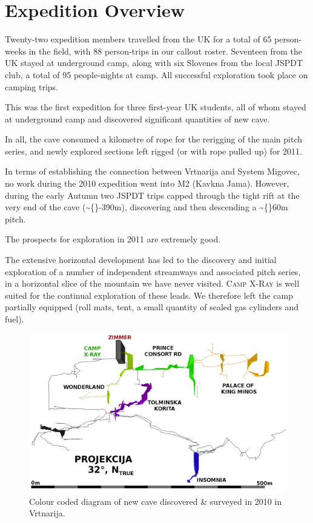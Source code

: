 \section{Expedition Overview}\label{expedition-overview}

Twenty-two expedition members travelled from the UK for a total of 65
person-weeks in the field, with 88 person-trips in our callout roster.
Seventeen from the UK stayed at underground camp, along with six
Slovenes from the local JSPDT club, a total of 95 people-nights at camp.
All successful exploration took place on camping trips.

This was the first expedition for three first-year UK students, all of
whom stayed at underground camp and discovered significant quantities of
new cave.

In all, the cave consumed a kilometre of rope for the rerigging of the
main pitch series, and newly explored sections left rigged (or with rope
pulled up) for 2011.

In terms of establishing the connection between Vrtnarija and System
Migovec, no work during the 2010 expedition went into M2 (Kavkna Jama).
However, during the early Autumn two JSPDT trips capped through the
tight rift at the very end of the cave (\textasciitilde\{\}-390m),
discovering and then descending a \textasciitilde\{\}60m pitch.

The prospects for exploration in 2011 are extremely good.

The extensive horizontal development has led to the discovery and
initial exploration of a number of independent streamways and associated
pitch series, in a horizontal slice of the mountain we have never
visited. \textsc{Camp X-Ray} is well suited for the continual
exploration of these leads. We therefore left the camp partially
equipped (roll mats, tent, a small quantity of sealed gas cylinders and
fuel).

\begin{figure}
\includegraphics[width=0.85\columnwidth]{2010/2010_deep_vrtnarija_colour_coded_inverted_labelled}
\caption{Colour coded diagram of new cave discovered \& surveyed in 2010 in
Vrtnarija.}
\end{figure}

